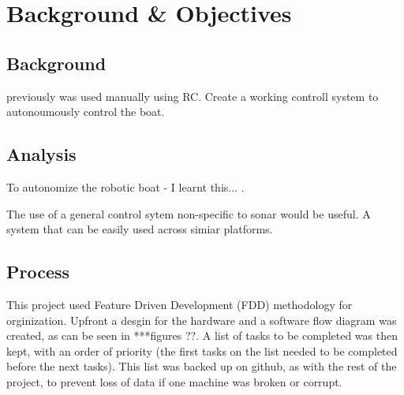 

\section{Background \& Objectives}

\subsection{Background}
previously was used manually using RC. Create a working controll 
system to autonoumously control the boat. 


\subsection{Analysis}
To autonomize the robotic boat - I learnt this... . 

The use of a general control sytem non-specific to sonar would be useful.
A system that can be easily used across simiar platforms. 







\subsection{Process}
This project used Feature Driven Development (FDD) methodology for orginization.
Upfront a desgin for the hardware and a software flow diagram was created, as can be
seen in ***figures ??. A list of tasks to be completed was then kept, with an order 
of priority (the first tasks on the list needed to be completed before the next tasks).
This list was backed up on github, as with the rest of the project, to prevent loss 
of data if one machine was broken or corrupt. 

